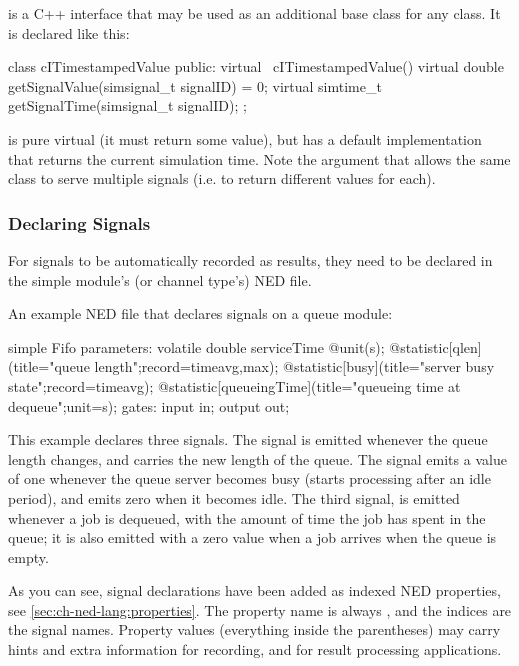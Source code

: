  is a C++ interface that may be used as an additional
base class for any class. It is declared like this:

\begin{cpp}
class cITimestampedValue {
    public:
        virtual ~cITimestampedValue() {}
        virtual double getSignalValue(simsignal_t signalID) = 0;
        virtual simtime_t getSignalTime(simsignal_t signalID);
};
\end{cpp}

 is pure virtual (it must return some value),
but  has a default implementation that
returns the current simulation time. Note the  argument
that allows the same class to serve multiple signals (i.e. to return
different values for each).


\subsubsection{Declaring Signals}
\label{sec:ch-simple-modules:statistic-signal-decl}

For signals to be automatically recorded as results, they need to be
declared in the simple module's (or channel type's) NED file.

An example NED file that declares signals on a queue module:

\begin{ned}
simple Fifo
{
    parameters:
        volatile double serviceTime @unit(s);
        @statistic[qlen](title="queue length";record=timeavg,max);
        @statistic[busy](title="server busy state";record=timeavg);
        @statistic[queueingTime](title="queueing time at dequeue";unit=s);
    gates:
        input in;
        output out;
}
\end{ned}

This example declares three signals. The  signal is emitted
whenever the queue length changes, and carries the new length of the queue.
The  signal emits a value of one whenever the queue server
becomes busy (starts processing after an idle period), and emits zero when
it becomes idle. The third signal,  is emitted whenever a
job is dequeued, with the amount of time the job has spent in the queue; it
is also emitted with a zero value when a job arrives when the queue is
empty.

As you can see, signal declarations have been added as indexed NED
properties, see \ref{sec:ch-ned-lang:properties}. The property name is
always , and the indices are the signal names. Property values
(everything inside the parentheses) may carry hints and extra information
for recording, and for result processing applications.

